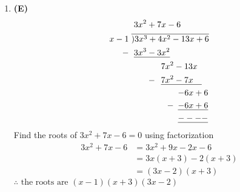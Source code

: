 \begin{multicols}{2}
\begin{enumerate}[label={\textbf{\arabic*.}}]
    \item \textbf{(E)}
    \begin{align*}
        &\hspace{3pt} 3x^2 + 7x - 6 \vspace{-10pt}\\ 
        x-1 \hspace{3pt}&\overline{)3x^3+4x^2-13x +6} \\
        -\hspace{3pt}& \hspace{3pt} \underline{3x^3 - 3x^2} \\
        \hspace{-40pt} & \hspace{35pt}  7x^2 - 13x \\ 
       -\hspace{-28pt} & \hspace{35pt} \underline{7x^2 - 7x \hspace{10pt}} \\
        & \hspace{55pt} {-6x + 6} \\
        -\hspace{-50pt}& \hspace{55pt} \underline{-6x + 6} \\
        & \hspace{55pt} \underline{----}
    \end{align*}
    Find the roots of $3x^2 + 7x -6 = 0$ using factorization 
    \begin{align*}
        3x^2 + 7x -6 &= 3x^2 + 9x - 2x -6  \\
        & = 3x(x+ 3) -2(x + 3) \\
        & = (3x - 2)(x + 3)
    \end{align*}
    $\therefore \text{ the roots are } (x-1)(x+3)(3x - 2)$


\end{enumerate}
\end{multicols}
